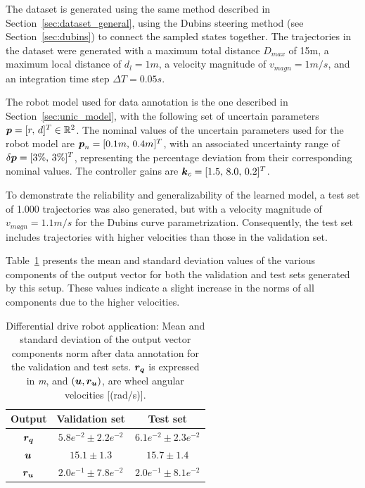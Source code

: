 The dataset is generated using the same method described in Section~\ref{sec:dataset_general}, using the Dubins steering method (see Section~\ref{sec:dubins}) to connect the sampled states together.
The trajectories in the dataset were generated with a maximum total distance $D_{max}$ of 15m, a maximum local distance of $d_l = 1m$, a velocity magnitude of $v_{magn} = 1 m/s$, and an integration time step $\Delta T = 0.05s$. 

The robot model used for data annotation is the one described in Section~\ref{sec:unic_model}, with the following set of uncertain parameters $\boldsymbol{p} = [r, \, d]^T \in \mathbb{R}^{2}$.
The nominal values of the uncertain parameters used for the robot model are  $\boldsymbol{p}_n = [0.1m, \, 0.4m]^T$, with an associated uncertainty range of $\delta\boldsymbol{p} = [3\%, \, 3\%]^T$, representing the percentage deviation from their corresponding nominal values.
The controller gains are $\boldsymbol{k}_c = [1.5, \, 8.0, \, 0.2]^T$.

To demonstrate the reliability and generalizability of the learned model, a test set of 1.000 trajectories was also generated, but with a velocity magnitude of $v_{magn} = 1.1 m/s$ for the Dubins curve parametrization. 
Consequently, the test set includes trajectories with higher velocities than those in the validation set.

Table~\ref{tab:datas_stats_unic} presents the mean and standard deviation values of the various components of the output vector for both the validation and test sets generated by this setup. 
These values indicate a slight increase in the norms of all components due to the higher velocities.

\begin{table}[h!]
    \centering
    \begin{tabular}{ | c | c || c |}
    \hline
      \textbf{Output}  & \textbf{Validation set}  & \textbf{Test set} \\ \hline
    $\boldsymbol{r_q}$ & $5.8e^{-2} \pm 2.2e^{-2}$ & $6.1e^{-2} \pm 2.3e^{-2}$ \\ \hline
    $\boldsymbol{u}$ & $15.1 \pm 1.3$ & $15.7 \pm 1.4$ \\ \hline
    $\boldsymbol{r_u}$ & $2.0e^{-1} \pm 7.8e^{-2}$ & $2.0e^{-1} \pm 8.1e^{-2}$ \\ \hline
\end{tabular}
\caption{
    Differential drive robot application: Mean and standard deviation of the output vector components norm after data annotation for the validation and test sets.
$\boldsymbol{r_q}$ is expressed in \emph{m}, and $(\boldsymbol{u}, \boldsymbol{r_u})$, are wheel angular velocities [(rad/s)].}
 \label{tab:datas_stats_unic}
\end{table}


